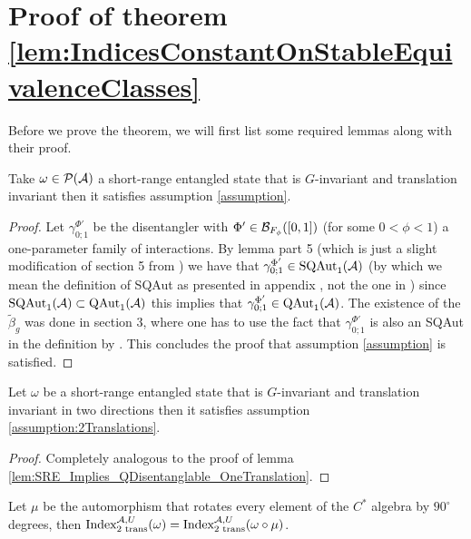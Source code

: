\documentclass[11pt,a4paper,twoside]{article}
\def\version{1}
\newcommand{\versionDifference}[2]{\ifthenelse{\version=0}{#1}{#2}}
\numberwithin{equation}{section}
\begin{document}
	\section{Proof of theorem \ref{lem:IndicesConstantOnStableEquivalenceClasses}}\label{sec:ProofOfMainResult1}\label{sec:ProofOf:lem:IndicesConstantOnStableEquivalenceClasses}
	Before we prove the theorem, we will first list some required lemmas along with their proof.
	\begin{lemma}\label{lem:SRE_Implies_QDisentanglable_OneTranslation}
		Take $\omega\in\PP(\AA)$ a short-range entangled state that is $G$-invariant and translation invariant then it satisfies assumption \ref{assumption}.
	\end{lemma}
	\begin{proof}
		Let $\gamma^{\Phi'}_{0;1}$ be the disentangler with $\Phi'\in\BB_{F_\phi}([0,1])$ (for some $0<\phi<1$) a one-parameter family of interactions. By lemma \versionDifference{\ref{lem:PropertiesLocallyGeneratedAutomorphisms}}{C.4. of \cite{jappens2023spt}} part 5 (which is just a slight modification of section 5 from \cite{ogata2021h3gmathbb}) we have that $\gamma^{\Phi'}_{0;1}\in\textrm{SQAut}_1(\AA)$ (by which we mean the definition of SQAut as presented in appendix \versionDifference{\ref{sec:properties-of-locally-generated-automorphisms-2d}}{C of \cite{jappens2023spt}}, not the one in \cite{ogata2021h3gmathbb}) since $\textrm{SQAut}_1(\AA)\subset\QAut{\AA}$ this implies that $\gamma^{\Phi'}_{0;1}\in\QAut{\AA}$. The existence of the $\tilde{\beta}_g$ was done in \cite{ogata2021h3gmathbb} section 3, where one has to use the fact that $\gamma^{\Phi'}_{0;1}$ is also an SQAut in the definition by \cite{ogata2021h3gmathbb}. This concludes the proof that assumption \ref{assumption} is satisfied.
	\end{proof}
	\begin{lemma}\label{lem:SRE_Implies_QDisentanglable_TwoTranslations}
		Let $\omega$ be a short-range entangled state that is $G$-invariant and translation invariant in two directions then it satisfies assumption \ref{assumption:2Translations}.
	\end{lemma}
	\begin{proof}
		Completely analogous to the proof of lemma \ref{lem:SRE_Implies_QDisentanglable_OneTranslation}.
	\end{proof}
	\begin{lemma}\label{lem:RotationDoesn'tChangeH1Index}
		Let $\mu$ be the automorphism that rotates every element of the $C^*$ algebra by $90^\circ$ degrees, then $\textrm{Index}_{\text{2 trans}}^{\AA,U}(\omega)=\textrm{Index}_{\text{2 trans}}^{\AA,U}(\omega\circ\mu)$.
	\end{lemma}
\end{document}
